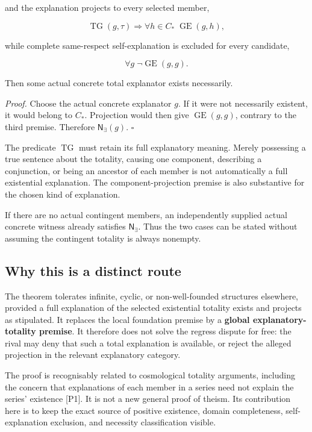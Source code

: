 \documentclass[11pt,a4paper]{article}
\begin{document}
and the explanation projects to every selected member,

\nopagebreak[4]

\[
\operatorname{TG}(g,\tau)\Longrightarrow
       \forall h\in C_*\;\operatorname{GE}(g,h),
\]

while complete same-respect self-explanation is excluded for every
candidate,

\nopagebreak[4]

\[
\forall g\;\neg\operatorname{GE}(g,g).
\]

Then some actual concrete total explanator exists necessarily.

\emph{Proof.} Choose the actual concrete explanator \(g\). If it were
not necessarily existent, it would belong to \(C_*\). Projection would
then give \(\operatorname{GE}(g,g)\), contrary to the third premise.
Therefore \(\mathsf N_{\exists}(g)\). \(\square\)

The predicate \(\operatorname{TG}\) must retain its full explanatory
meaning. Merely possessing a true sentence about the totality, causing
one component, describing a conjunction, or being an ancestor of each
member is not automatically a full existential explanation. The
component-projection premise is also substantive for the chosen kind of
explanation.

If there are no actual contingent members, an independently supplied
actual concrete witness already satisfies \(\mathsf N_{\exists}\). Thus
the two cases can be stated without assuming the contingent totality is
always nonempty.

\subsection{Why this is a distinct
route}\label{why-this-is-a-distinct-route}

The theorem tolerates infinite, cyclic, or non-well-founded structures
elsewhere, provided a full explanation of the selected existential
totality exists and projects as stipulated. It replaces the local
foundation premise by a \textbf{global explanatory-totality premise}. It
therefore does not solve the regress dispute for free: the rival may
deny that such a total explanation is available, or reject the alleged
projection in the relevant explanatory category.

The proof is recognisably related to cosmological totality arguments,
including the concern that explanations of each member in a series need
not explain the series' existence {[}P1{]}. It is not a new general
proof of theism. Its contribution here is to keep the exact source of
positive existence, domain completeness, self-explanation exclusion, and
necessity classification visible.
\end{document}
